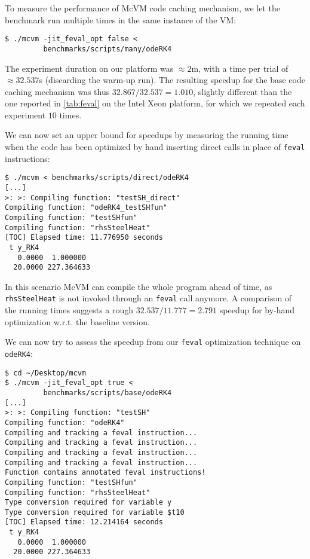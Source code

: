 \noindent To measure the performance of McVM code caching mechanism, we let the benchmark run multiple times in the same instance of the VM:

\begin{small}
\begin{verbatim}
$ ./mcvm -jit_feval_opt false <
         benchmarks/scripts/many/odeRK4
\end{verbatim}
\end{small}

\noindent The experiment duration on our platform was $\approx2$m, with a time per trial of $\approx32.537$s (discarding the warm-up run). The resulting speedup for the base code caching mechanism was thus $32.867/32.537=1.010$, slightly different than the one reported in \mytable\ref{tab:feval} on the Intel Xeon platform, for which we repeated each experiment $10$ times.

We can now set an upper bound for speedups by measuring the running time when the code has been optimized by hand inserting direct calls in place of {\tt feval} instructions:

\begin{small}
\begin{verbatim}
$ ./mcvm < benchmarks/scripts/direct/odeRK4
[...]
>: >: Compiling function: "testSH_direct"
Compiling function: "odeRK4_testSHfun"
Compiling function: "testSHfun"
Compiling function: "rhsSteelHeat"
[TOC] Elapsed time: 11.776950 seconds
 t y_RK4
   0.0000  1.000000
  20.0000 227.364633
\end{verbatim}
\end{small}

\noindent In this scenario McVM can compile the whole program ahead of time, as {\tt rhsSteelHeat} is not invoked through an {\tt feval} call anymore. A comparison of the running times suggests a rough $32.537/11.777=2.791$ speedup for by-hand optimization w.r.t. the baseline version.

We can now try to assess the speedup from our {\tt feval} optimization technique on {\tt odeRK4}:

\begin{small}
\begin{verbatim}
$ cd ~/Desktop/mcvm
$ ./mcvm -jit_feval_opt true <
         benchmarks/scripts/base/odeRK4
[...]
>: >: Compiling function: "testSH"
Compiling function: "odeRK4"
Compiling and tracking a feval instruction...
Compiling and tracking a feval instruction...
Compiling and tracking a feval instruction...
Compiling and tracking a feval instruction...
Function contains annotated feval instructions!
Compiling function: "testSHfun"
Compiling function: "rhsSteelHeat"
Type conversion required for variable y
Type conversion required for variable $t10
[TOC] Elapsed time: 12.214164 seconds
 t y_RK4
   0.0000  1.000000
  20.0000 227.364633
\end{verbatim}
\end{small}

